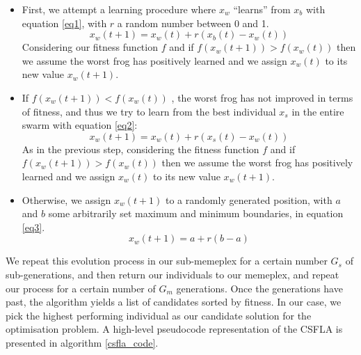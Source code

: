 \documentclass[conference]{IEEEtran}
\begin{document}
\begin{itemize}
\item First, we attempt a learning procedure where \(x_{w}\) “learns” from \(x_{b}\) with equation \ref{eq1}, with \(r\) a random number between 0 and 1. 
\begin{equation}
x_{w}(t+1)=x_{w}(t)+r(x_{b}(t) - x_{w}(t))\label{eq1}
\end{equation}
Considering our fitness function \(f\) and if \(f(x_{w}(t+1))>f(x_{w}(t))\) then we assume the worst frog has positively learned and we assign \(x_{w}(t)\) to its new value \(x_{w}(t+1)\). 

\item If \(f(x_{w}(t+1))<f(x_{w}(t))\) , the worst frog has not improved in terms of fitness, and thus we try to learn from the best individual \(x_{s}\) in the entire swarm with equation \ref{eq2}:
\begin{equation}
x_{w}(t+1)=x_{w}(t)+r(x_{s}(t) - x_{w}(t))\label{eq2}
\end{equation}
As in the previous step, considering the fitness function \(f\) and if \(f(x_{w}(t+1))>f(x_{w}(t))\) then we assume the worst frog has positively learned and we assign \(x_{w}(t)\) to its new value \(x_{w}(t+1)\).

\item Otherwise, we assign \(x_{w}(t+1)\) to a randomly generated position, with \(a\) and \(b\) some arbitrarily set maximum and minimum boundaries, in equation \ref{eq3}.
\begin{equation}
x_{w}(t+1)=a+r(b-a)\label{eq3}
\end{equation}

\end{itemize}

We repeat this evolution process in our sub-memeplex for a certain number \(G_{s}\) of sub-generations, and then return our individuals to our memeplex, and repeat our process for a certain number of \(G_{m}\) generations. Once the generations have past, the algorithm yields a list of candidates sorted by fitness. In our case, we pick the highest performing individual as our candidate solution for the optimisation problem. A high-level pseudocode representation of the CSFLA is presented in algorithm \ref{csfla_code}.
\end{document}
